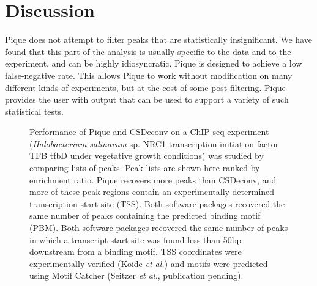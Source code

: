 \documentclass{bioinfo}
\begin{document}
\section{Discussion}

Pique does not attempt to filter peaks that are statistically
insignificant. We have found that this part of the analysis is usually
specific to the data and to the experiment, and can be highly
idiosyncratic. Pique is designed to achieve a low false-negative
rate. This allows Pique to work without modification on many different
kinds of experiments, but at the cost of some post-filtering. Pique
provides the user with output that can be used to support a variety of
such statistical tests.

\begin{figure}
  \begin{center}
    {}
  \end{center}
  \caption{Performance of Pique and CSDeconv on a ChIP-seq experiment
    ({\em Halobacterium salinarum} sp. NRC1 transcription initiation
    factor TFB tfbD under vegetative growth conditions) was studied by
    comparing lists of peaks. Peak lists are shown here ranked by
    enrichment ratio. Pique recovers more peaks than CSDeconv, and
    more of these peak regions contain an experimentally determined
    transcription start site (TSS). Both software packages recovered
    the same number of peaks containing the predicted binding motif
    (PBM). Both software packages recovered the same number of peaks
    in which a transcript start site was found less than 50bp
    downstream from a binding motif. TSS coordinates were
    experimentally verified (Koide {\em et al.}) \cite{halo_promoters}
    and motifs were predicted using Motif Catcher (Seitzer {\em et
      al.}, publication pending).}\label{fig:02}
\end{figure}
\end{document}
